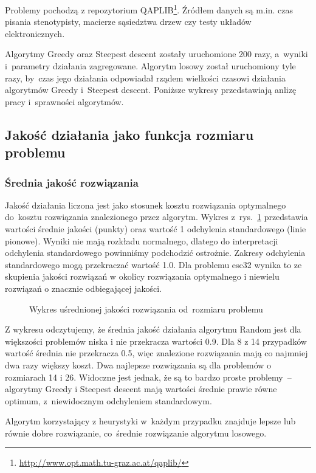 \documentclass[a4paper,10pt]{article}
\begin{document}
Problemy pochodzą z repozytorium QAPLIB\footnote{\url{http://www.opt.math.tu-graz.ac.at/qaplib/}}.
Źródłem danych są m.in. czas pisania stenotypisty, macierze sąsiedztwa drzew czy testy układów elektronicznych.

Algorytmy Greedy oraz Steepest descent zostały uruchomione 200 razy, a~wyniki i~parametry działania zagregowane. 
Algorytm losowy został uruchomiony tyle razy, by~czas jego działania odpowiadał rządem wielkości czasowi działania algorytmów Greedy
i~Steepest descent.
Poniższe wykresy przedstawiają anlizę pracy i~sprawności algorytmów.
\subsection{Jakość działania jako funkcja rozmiaru problemu}
\subsubsection{Średnia jakość rozwiązania}
Jakość działania liczona jest jako stosunek kosztu rozwiązania optymalnego do~kosztu rozwiązania znalezionego przez
algorytm.
Wykres z~rys.~\ref{fig:qualityvssizemean} przedstawia wartości średnie jakości (punkty) oraz wartość 1 odchylenia standardowego (linie pionowe).
Wyniki nie mają rozkładu normalnego, dlatego do interpretacji odchylenia standardowego powinniśmy podchodzić ostrożnie.
Zakresy odchylenia standardowego mogą przekraczać wartość \num{1.0}.
Dla problemu esc32 wynika to ze skupienia jakości rozwiązań w okolicy rozwiązania optymalnego i niewielu rozwiązań o znacznie odbiegającej jakości.
\begin{figure}[!htpb]
\begin{center}

\caption{Wykres uśrednionej jakości rozwiązania od~rozmiaru problemu}
\label{fig:qualityvssizemean}
\end{center}
\end{figure}

Z wykresu odczytujemy, że średnia jakość działania algorytmu Random jest dla większości problemów niska i nie przekracza wartości \num{0.9}.  
Dla 8 z 14 przypadków wartość średnia nie przekracza \num{0.5}, więc znalezione rozwiązania mają co najmniej dwa razy większy koszt.
Dwa najlepsze rozwiązania są dla problemów o rozmiarach 14 i 26.
Widoczne jest jednak, że są to bardzo proste problemy~-- algorytmy Greedy i Steepest descent mają wartości średnie prawie równe optimum,
z~niewidocznym odchyleniem standardowym.

Algorytm korzystający z heurystyki w~każdym przypadku znajduje lepsze lub równie dobre rozwiązanie, co~średnie rozwiązanie algorytmu losowego.
\end{document}

